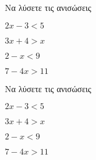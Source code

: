 Να λύσετε τις ανισώσεις
\begin{alist}
\item $ 2x-3<5 $
\item $ 3x+4>x $
\item $ 2-x<9 $
\item $ 7-4x>11 $
\end{alist}
Να λύσετε τις ανισώσεις
\begin{alist}
\item $ 2x-3<5 $
\item $ 3x+4>x $
\item $ 2-x<9 $
\item $ 7-4x>11 $
\end{alist}
